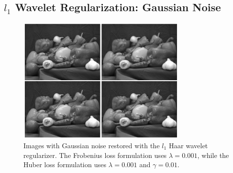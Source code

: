 \documentclass[10pt,a4paper]{article}
\begin{document}
	\subsection{$l_1$ Wavelet Regularization: Gaussian Noise}
	\begin{figure}[H]
		\begin{center}
			\includegraphics[width = 0.75\textwidth]{../figures/waveletGaussH.pdf} 
		\end{center}
		\caption{Images with Gaussian noise restored with the $l_1$ Haar wavelet regularizer. The Frobenius loss formulation uses $\lambda = 0.001$, while the Huber loss formulation uses $\lambda = 0.001$ and $\gamma = 0.01$. }
		\label{waveletH_gauss}
	\end{figure}
	\vspace{-1ex}
\end{document}
